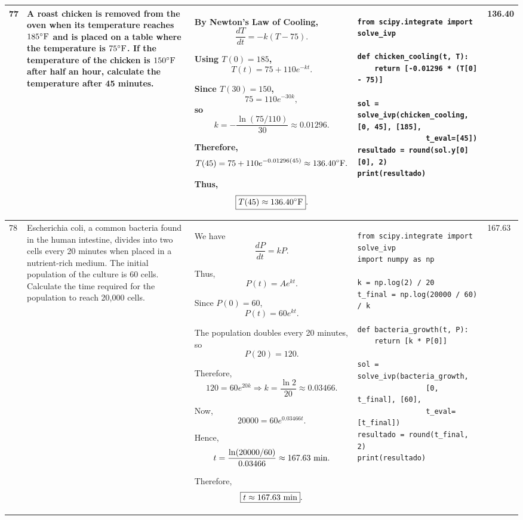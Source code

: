 \documentclass[a4paper,12pt]{article}
\begin{document}
\begin{longtable}{|p{0.3cm}|p{}|p{10cm}|p{}|p{1.5cm}|}
77 &
A roast chicken is removed from the oven when its temperature reaches $185^\circ{\rm F}$ and is placed on a table where the temperature is $75^\circ{\rm F}$. If the temperature of the chicken is $150^\circ{\rm F}$ after half an hour, calculate the temperature after 45 minutes. &
By Newton's Law of Cooling,
\[
\frac{dT}{dt}=-k(T-75).
\]

Using $T(0)=185$,
\[
T(t)=75+110e^{-kt}.
\]

Since $T(30)=150$,
\[
75=110e^{-30k},
\]
so
\[
k=-\frac{\ln(75/110)}{30}
\approx0.01296.
\]

Therefore,
\[
T(45)=75+110e^{-0.01296(45)}
\approx136.40^\circ{\rm F}.
\]

Thus,
\[
\boxed{T(45)\approx136.40^\circ{\rm F}}.
\]
&
\begin{verbatim}
from scipy.integrate import solve_ivp

def chicken_cooling(t, T):
    return [-0.01296 * (T[0] - 75)]

sol = solve_ivp(chicken_cooling, [0, 45], [185],
                t_eval=[45])
resultado = round(sol.y[0][0], 2)
print(resultado)
\end{verbatim}
&
136.40 \\
\hline

78 &
Escherichia coli, a common bacteria found in the human intestine, divides into two cells every 20 minutes when placed in a nutrient-rich medium. The initial population of the culture is 60 cells. Calculate the time required for the population to reach 20,000 cells. &
We have
\[
\frac{dP}{dt}=kP.
\]

Thus,
\[
P(t)=Ae^{kt}.
\]

Since $P(0)=60$,
\[
P(t)=60e^{kt}.
\]

The population doubles every 20 minutes, so
\[
P(20)=120.
\]

Therefore,
\[
120=60e^{20k}
\Rightarrow
k=\frac{\ln2}{20}
\approx0.03466.
\]

Now,
\[
20000=60e^{0.03466t}.
\]

Hence,
\[
t=\frac{\ln(20000/60)}{0.03466}
\approx167.63\ {\rm min}.
\]

Therefore,
\[
\boxed{t\approx167.63\ {\rm min}}.
\]
&
\begin{verbatim}
from scipy.integrate import solve_ivp
import numpy as np

k = np.log(2) / 20
t_final = np.log(20000 / 60) / k

def bacteria_growth(t, P):
    return [k * P[0]]

sol = solve_ivp(bacteria_growth,
                [0, t_final], [60],
                t_eval=[t_final])
resultado = round(t_final, 2)
print(resultado)
\end{verbatim}
&
167.63 \\
\hline


\end{longtable}
\end{document}
